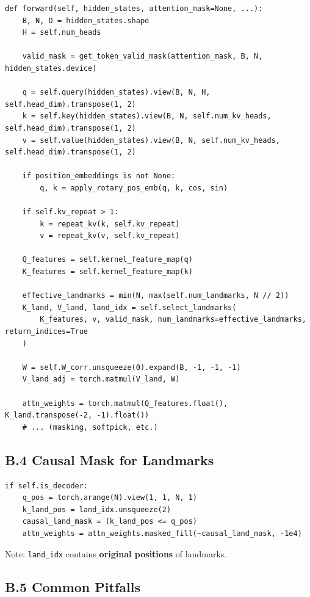 \begin{lstlisting}
def forward(self, hidden_states, attention_mask=None, ...):
    B, N, D = hidden_states.shape
    H = self.num_heads
    
    valid_mask = get_token_valid_mask(attention_mask, B, N, hidden_states.device)
    
    q = self.query(hidden_states).view(B, N, H, self.head_dim).transpose(1, 2)
    k = self.key(hidden_states).view(B, N, self.num_kv_heads, self.head_dim).transpose(1, 2)
    v = self.value(hidden_states).view(B, N, self.num_kv_heads, self.head_dim).transpose(1, 2)
    
    if position_embeddings is not None:
        q, k = apply_rotary_pos_emb(q, k, cos, sin)
    
    if self.kv_repeat > 1:
        k = repeat_kv(k, self.kv_repeat)
        v = repeat_kv(v, self.kv_repeat)
    
    Q_features = self.kernel_feature_map(q)
    K_features = self.kernel_feature_map(k)
    
    effective_landmarks = min(N, max(self.num_landmarks, N // 2))
    K_land, V_land, land_idx = self.select_landmarks(
        K_features, v, valid_mask, num_landmarks=effective_landmarks, return_indices=True
    )
    
    W = self.W_corr.unsqueeze(0).expand(B, -1, -1, -1)
    V_land_adj = torch.matmul(V_land, W)
    
    attn_weights = torch.matmul(Q_features.float(), K_land.transpose(-2, -1).float())
    # ... (masking, softpick, etc.)
\end{lstlisting}

\subsection{B.4 Causal Mask for Landmarks}

\begin{lstlisting}
if self.is_decoder:
    q_pos = torch.arange(N).view(1, 1, N, 1)
    k_land_pos = land_idx.unsqueeze(2)
    causal_land_mask = (k_land_pos <= q_pos)
    attn_weights = attn_weights.masked_fill(~causal_land_mask, -1e4)
\end{lstlisting}

Note: \texttt{land\_idx} contains \textbf{original positions} of landmarks.

\subsection{B.5 Common Pitfalls}

